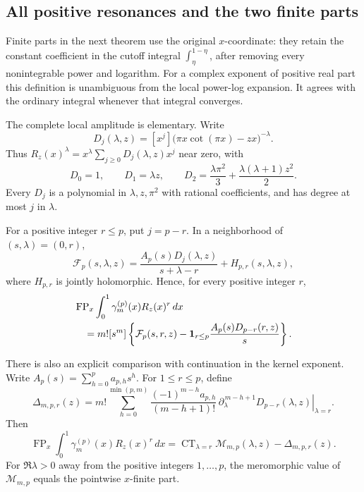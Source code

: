 \subsection{All positive resonances and the two finite parts}

Finite parts in the next theorem use the original \(x\)-coordinate:
they retain the constant coefficient in the cutoff integral
\(\int_\eta^{1-\eta}\), after removing every nonintegrable power
and logarithm.  For a complex exponent of positive real part this
definition is unambiguous from the local power-log expansion.
It agrees with the ordinary integral whenever that integral converges.

The complete local amplitude is elementary.  Write
\begin{equation}\label{bhr:cxp:eq:d}
 D_j(\lambda,z)
 =[x^j]\bigl(\pi x\cot(\pi x)-zx\bigr)^{-\lambda}.
\end{equation}
Thus \(R_z(x)^\lambda
=x^\lambda\sum_{j\ge0}D_j(\lambda,z)x^j\) near zero, with
\[
 D_0=1,\qquad D_1=\lambda z,\qquad
 D_2=\frac{\lambda\pi^2}{3}
       +\frac{\lambda(\lambda+1)z^2}{2}.
\]
Every \(D_j\) is a polynomial in \(\lambda,z,\pi^2\) with rational
coefficients, and has degree at most \(j\) in \(\lambda\).

\begin{theorem}
\label{bhr:cxp:thm:contacts}
For a positive integer \(r\le p\), put \(j=p-r\).
In a neighborhood of \((s,\lambda)=(0,r)\),
\begin{equation}\label{bhr:cxp:eq:amplitude}
 \mathcal F_p(s,\lambda,z)
  =\frac{A_p(s)D_j(\lambda,z)}{s+\lambda-r}
      +H_{p,r}(s,\lambda,z),
\end{equation}
where \(H_{p,r}\) is jointly holomorphic.  Hence, for every
positive integer \(r\),
\begin{align}
 &\operatorname{FP}_x\int_0^1
       \gamma_m^{(p)}(x)R_z(x)^r\,dx\notag\\
 &\quad =
 m![s^m]\left\{
   \mathcal F_p(s,r,z)
   -\mathbf1_{r\le p}\frac{A_p(s)D_{p-r}(r,z)}s
           \right\}. \label{bhr:cxp:eq:fixed-r}
\end{align}

There is also an explicit comparison with continuation in the
kernel exponent.  Write \(A_p(s)=\sum_{h=0}^p a_{p,h}s^h\).
For \(1\le r\le p\), define
\begin{equation}\label{bhr:cxp:eq:Delta}
 \Delta_{m,p,r}(z)=m!
 \sum_{h=0}^{\min(p,m)}
 \frac{(-1)^{m-h}a_{p,h}}{(m-h+1)!}\,
 \left.\partial_\lambda^{\,m-h+1}
                 D_{p-r}(\lambda,z)\right|_{\lambda=r}.
\end{equation}
Then
\begin{equation}\label{bhr:cxp:eq:lambdaCT}
 \operatorname{FP}_x\int_0^1
   \gamma_m^{(p)}(x)R_z(x)^r\,dx
 =\operatorname{CT}_{\lambda=r}
      \mathcal M_{m,p}(\lambda,z)-\Delta_{m,p,r}(z).
\end{equation}
For \(\Re\lambda>0\) away from the positive integers
\(1,\ldots,p\), the meromorphic value of
\(\mathcal M_{m,p}\) equals the pointwise \(x\)-finite part.
\end{theorem}

